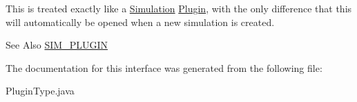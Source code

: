 This is treated exactly like a \hyperlink{classorg_1_1contikios_1_1cooja_1_1Simulation}{Simulation} \hyperlink{interfaceorg_1_1contikios_1_1cooja_1_1Plugin}{Plugin}, with the only difference that this will automatically be opened when a new simulation is created.

\begin{DoxySeeAlso}{See Also}
\hyperlink{interfaceorg_1_1contikios_1_1cooja_1_1PluginType_a72817595223732361a60e932965ffc24}{S\-I\-M\-\_\-\-P\-L\-U\-G\-I\-N} 
\end{DoxySeeAlso}


The documentation for this interface was generated from the following file\-:\begin{DoxyCompactItemize}
\item 
Plugin\-Type.\-java\end{DoxyCompactItemize}
